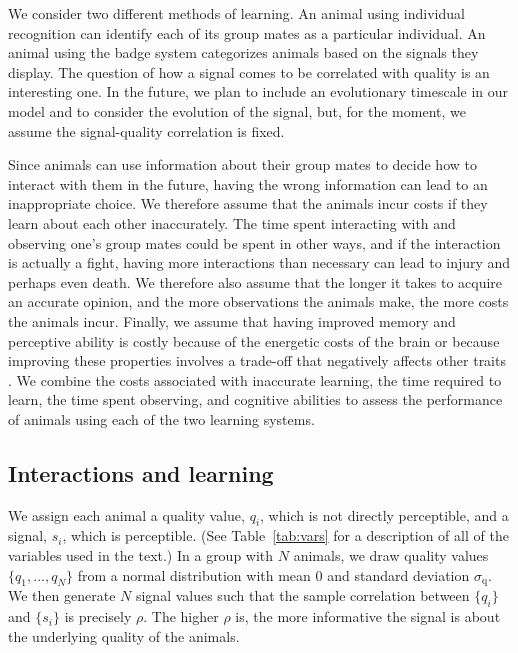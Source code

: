 We consider two different methods of learning. An animal using individual recognition can identify each of its group mates as a particular individual. An animal using the badge system categorizes animals based on the signals they display. The question of how a signal comes to be correlated with quality is an interesting one. In the future, we plan to include an evolutionary timescale in our model and to consider the evolution of the signal, but, for the moment, we assume the signal-quality correlation is fixed.

Since animals can use information about their group mates to decide how to interact with them in the future, having the wrong information can lead to an inappropriate choice. We therefore assume that the animals incur costs if they learn about each other inaccurately. The time spent interacting with and observing one's group mates could be spent in other ways, and if the interaction is actually a fight, having more interactions than necessary can lead to injury and perhaps even death.  We therefore also assume that the longer it takes to acquire an accurate opinion, and the more observations the animals make, the more costs the animals incur. Finally, we assume that having improved memory and perceptive ability is costly because of the energetic costs of the brain \citep{Dunbar:1992ys,Laughlin:1998ly,Laughlin:2001qf} or because improving these properties involves a trade-off that negatively affects other traits \citep{MacIver:2010ve}. We combine the costs associated with inaccurate learning, the time required to learn, the time spent observing, and cognitive abilities to assess the performance of animals using each of the two learning systems.  

\subsection{Interactions and learning }
We assign each animal a quality value, $q_i$, which is not directly perceptible, and a signal, $s_i$, which is perceptible.  (See Table~\ref{tab:vars} for a description of all of the variables used in the text.) In a group with $N$ animals, we draw quality values $\{q_1,\dots,q_N\}$ from a normal distribution with mean $0$ and standard deviation $\sigma_\text{q}$. We then generate $N$ signal values such that 
the sample correlation between $\{q_i\}$ and $\{s_i\}$ is precisely $\rho$. 
The higher $\rho$ is, the more informative the signal is about the underlying quality of the animals.
  
